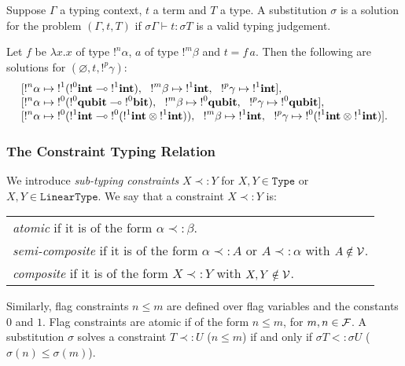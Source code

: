 \begin{defn}
	\label{decl_problem}
	Suppose $\Gamma$ a typing context, $t$ a term and $T$ a type. A substitution $\sigma$ is a solution for the problem $(\Gamma, t, T)$ if
	$\sigma \Gamma \vdash t : \sigma T$ is a valid typing judgement.
\end{defn}

\begin{exmp} Let $f$ be $\lambda x.x$ of type $!^n \alpha$, $a$ of type $!^m \beta$ and $t = f \, a$. Then the following 	are solutions for $(\varnothing, t, !^p \gamma)$:
  \[
  \begin{array}{l}\relax
    [{!}^n\alpha \mapsto {!}^1({!}^0\textrm{\bf int} \multimap {!}^1\textrm{\bf int}),~~ {!}^m\beta \mapsto {!}^1\textrm{\bf int},~~ {!}^p\gamma \mapsto {!}^1\textrm{\bf int}], \\\relax
    [{!}^n\alpha \mapsto {!}^0({!}^0\textrm{\bf qubit} \multimap {!}^0\textrm{\bf bit}),~~ {!}^m\beta \mapsto {!}^0\textrm{\bf qubit},~~ {!}^p\gamma \mapsto {!}^0\textrm{\bf qubit}], \\\relax
    [{!}^n\alpha \mapsto {!}^0({!}^1\textrm{\bf int} \multimap {!}^0({!}^1\textrm{\bf int} \otimes {!}^1\textrm{\bf int})),
    ~~ {!}^m\beta \mapsto {!}^1\textrm{\bf int},
    ~~ {!}^p\gamma \mapsto {!}^0({!}^1\textrm{\bf int} \otimes {!}^1\textrm{\bf int})].
  \end{array}
  \]
\end{exmp}

\subsubsection{The Constraint Typing Relation}

\begin{defn} We introduce {\em sub-typing constraints} $X \prec: Y$ for $X, Y \in \texttt{Type}$ or $X, Y \in \texttt{LinearType}$.
We say that a constraint $X \prec: Y$ is:
		\begin{center}
		\begin{tabular}{l}
			\textit{atomic} if it is of the form $\alpha \prec: \beta$. \\
			\textit{semi-composite} if it is of the form $\alpha \prec: A$ or $A \prec: \alpha$ with $A \notin \mathcal{V}$. \\
			\textit{composite} if it is of the form $X \prec: Y$ with $X, Y \notin \mathcal{V}$.
		\end{tabular}
		\end{center}
  Similarly, flag constraints $n \le m$ are defined over flag variables and the constants $0$ and $1$. Flag constraints are atomic if of the form $n \le m$,
  for $m, n\in \mathcal{F}$.
  A substitution $\sigma$ solves a constraint $T \prec: U$ ($n \le m$) if and only if $\sigma T <: \sigma U$ ($\sigma(n) \le \sigma(m)$).
\end{defn}

